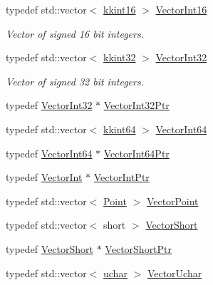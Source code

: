 \begin{DoxyCompactItemize}
\item 
typedef std\+::vector$<$ \hyperlink{namespace_k_k_b_a93809780ee294124dda4c23069f41248}{kkint16} $>$ \hyperlink{namespace_k_k_b_ac2cb16557b269f092b9b8d05c90c0c9f}{Vector\+Int16}
\begin{DoxyCompactList}\small\item\em Vector of signed 16 bit integers. \end{DoxyCompactList}\item 
typedef std\+::vector$<$ \hyperlink{namespace_k_k_b_a8fa4952cc84fda1de4bec1fbdd8d5b1b}{kkint32} $>$ \hyperlink{namespace_k_k_b_adf8a10085d231870d8a072046d6cba10}{Vector\+Int32}
\begin{DoxyCompactList}\small\item\em Vector of signed 32 bit integers. \end{DoxyCompactList}\item 
typedef \hyperlink{namespace_k_k_b_adf8a10085d231870d8a072046d6cba10}{Vector\+Int32} $\ast$ \hyperlink{namespace_k_k_b_a0a0457effc318aa340f69262261760eb}{Vector\+Int32\+Ptr}
\item 
typedef std\+::vector$<$ \hyperlink{namespace_k_k_b_aa3486b1c5ea9162b3b020c69f72826eb}{kkint64} $>$ \hyperlink{namespace_k_k_b_a53584303a9b1e1ae8f4c72034685bf99}{Vector\+Int64}
\item 
typedef \hyperlink{namespace_k_k_b_a53584303a9b1e1ae8f4c72034685bf99}{Vector\+Int64} $\ast$ \hyperlink{namespace_k_k_b_a9249e96328ebcbaa92560e5ffbd589ec}{Vector\+Int64\+Ptr}
\item 
typedef \hyperlink{namespace_k_k_b_a791ebe73f89917067a7aab9dbd817e45}{Vector\+Int} $\ast$ \hyperlink{namespace_k_k_b_a0fb33b081f971e43176068897f27428f}{Vector\+Int\+Ptr}
\item 
typedef std\+::vector$<$ \hyperlink{class_k_k_b_1_1_point}{Point} $>$ \hyperlink{namespace_k_k_b_a45768068a46dcf810be0a0f5a91627bb}{Vector\+Point}
\item 
typedef std\+::vector$<$ short $>$ \hyperlink{namespace_k_k_b_a17d2c938216be2f3e37e982067fa7234}{Vector\+Short}
\item 
typedef \hyperlink{namespace_k_k_b_a17d2c938216be2f3e37e982067fa7234}{Vector\+Short} $\ast$ \hyperlink{namespace_k_k_b_ab423dc7b2750fb78f63c613d0b94691b}{Vector\+Short\+Ptr}
\item 
typedef std\+::vector$<$ \hyperlink{namespace_k_k_b_ace9969169bf514f9ee6185186949cdf7}{uchar} $>$ \hyperlink{namespace_k_k_b_a2e345982c9a919580d77a11178ad920a}{Vector\+Uchar}
\item 

\end{DoxyCompactItemize}
